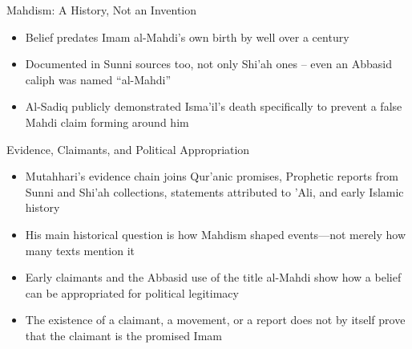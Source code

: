 \begin{frame}{Mahdism: A History, Not an Invention}
\begin{center}
\end{center}
\begin{itemize}[itemsep=3pt]
  \item Belief predates Imam al-Mahdi's own birth by well over a century
  \item Documented in Sunni sources too, not only Shi'ah ones -- even an Abbasid caliph was named ``al-Mahdi''
  \item Al-Sadiq publicly demonstrated Isma'il's death specifically to prevent a false Mahdi claim forming around him
\end{itemize}
\end{frame}

\begin{frame}{Evidence, Claimants, and Political Appropriation}
\begin{itemize}[itemsep=5pt]
  \item Mutahhari's evidence chain joins Qur'anic promises, Prophetic reports from Sunni and Shi'ah collections, statements attributed to 'Ali, and early Islamic history
  \item His main historical question is how Mahdism shaped events—not merely how many texts mention it
  \item Early claimants and the Abbasid use of the title al-Mahdi show how a belief can be appropriated for political legitimacy
  \item The existence of a claimant, a movement, or a report does not by itself prove that the claimant is the promised Imam
\end{itemize}
\end{frame}


